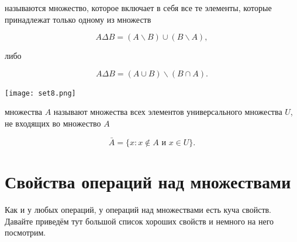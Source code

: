 \documentclass[12pt, a4paper]{article}
\begin{document}
\begin{center}
\end{center}


\begin{mydef}
 называются множество, которое включает в себя все те элементы, которые принадлежат только одному из множеств

\[A \Delta B = (A \backslash B) \cup (B \backslash A),\]

либо 

\[A \Delta B =(A \cup B) \backslash (B \cap A).\]
\end{mydef}

\begin{center}
    \texttt{[image: set8.png]}
\end{center}


\begin{mydef}
 множества $A$ называют множества всех элементов универсального множества $U$, не входящих во множество $A$

\[\bar{A} = \{x: x \notin A \text{ и } x \in U \}.\]
\end{mydef}


\section{Свойства операций над множествами} 

Как и у любых операций, у операций над множествами есть куча свойств. Давайте приведём тут большой список хороших свойств и немного на него посмотрим. 
\end{document}

